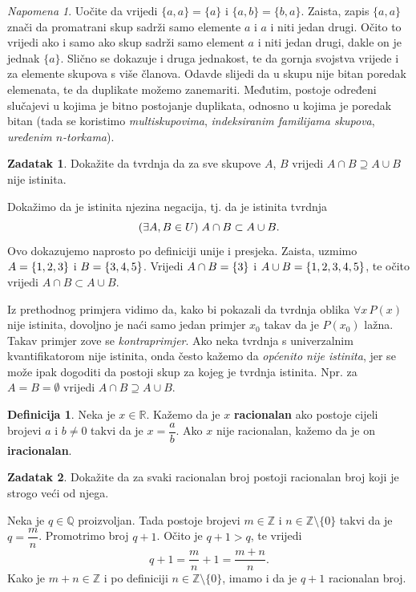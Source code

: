 \documentclass{book}
\let\originalleft\left
\let\originalright\right
\renewcommand{\left}{\mathopen{}\mathclose\bgroup\originalleft}
\renewcommand{\right}{\aftergroup\egroup\originalright}
\renewenvironment{proof}{%
    \vspace{-\parskip}\begin{oldproof}%
    }{%
    \end{oldproof}%
}
\theoremstyle{definition}
\theoremstyle{definition}
\newtheorem{definition}{Definicija}
\newtheorem{exercise}{Zadatak}
\theoremstyle{remark}
\newtheorem{remark}{Napomena}
\begin{document}
\begin{remark}
Uočite da vrijedi $\{a, a\}=\{a\}$ i $\{a, b\}=\{b, a\}$. Zaista, zapis $\{a, a\}$ znači da promatrani skup sadrži samo elemente $a$ i $a$ i niti jedan drugi. Očito to vrijedi ako i samo ako skup sadrži samo element $a$ i niti jedan drugi, dakle on je jednak $\{a\}$. Slično se dokazuje i druga jednakost, te da gornja svojstva vrijede i za elemente skupova s više članova. Odavde slijedi da u skupu nije bitan poredak elemenata, te da duplikate možemo zanemariti. Međutim, postoje određeni slučajevi u kojima je bitno postojanje duplikata, odnosno u kojima je poredak bitan (tada se koristimo \textit{multiskupovima}, \textit{indeksiranim familijama skupova}, \textit{uređenim $n$-torkama}).
\end{remark}
\begin{exercise}
Dokažite da tvrdnja da za sve skupove $A$, $B$ vrijedi $A\cap B\supseteq A\cup B$ nije istinita.
\end{exercise}
\begin{proof}[Rješenje]
Dokažimo da je istinita njezina negacija, tj. da je istinita tvrdnja 
$$\left(\exists A, B\in U\right)\; A\cap B\subset A\cup B.$$
Ovo dokazujemo naprosto po definiciji unije i presjeka. Zaista, uzmimo $A=\left\{1, 2, 3\right\}$ i $B=\left\{3, 4, 5\right\}$. Vrijedi $A\cap B=\left\{3\right\}$ i $A\cup B=\left\{1, 2, 3, 4, 5\right\}$, te očito vrijedi $A\cap B\subset A\cup B$.
\end{proof}
Iz prethodnog primjera vidimo da, kako bi pokazali da tvrdnja oblika $\forall{x}\, P(x)$ nije istinita, dovoljno je naći samo jedan primjer $x_0$ takav da je $P(x_0)$ lažna. Takav primjer zove se \textit{kontraprimjer}. Ako neka tvrdnja s univerzalnim kvantifikatorom nije istinita, onda često kažemo da \textit{općenito nije istinita}, jer se može ipak dogoditi da postoji skup za kojeg je tvrdnja istinita. Npr. za $A=B=\emptyset$ vrijedi $A\cap B\supseteq A\cup B$.
\begin{definition}
Neka je $x\in \mathbb{R}$. Kažemo da je $x$ \textbf{racionalan} ako postoje cijeli brojevi $a$ i $b\neq 0$ takvi da je $x=\dfrac{a}{b}$. Ako $x$ nije racionalan, kažemo da je on \textbf{iracionalan}.
\end{definition}
\begin{exercise}
Dokažite da za svaki racionalan broj postoji racionalan broj koji je strogo veći od njega.
\end{exercise}
\begin{proof}[Rješenje]
Neka je $q\in \mathbb{Q}$ proizvoljan. Tada postoje brojevi $m\in \mathbb{Z}$ i $n\in \mathbb{Z}\setminus\{0\}$ takvi da je $q=\dfrac{m}{n}$. Promotrimo broj $q+1$. Očito je $q+1>q$, te vrijedi
$$q+1=\dfrac{m}{n}+1=\dfrac{m+n}{n}.$$
Kako je $m+n\in \mathbb{Z}$ i po definiciji $n\in \mathbb{Z}\setminus\{0\}$, imamo i da je $q+1$ racionalan broj.
\end{proof}
\end{document}
